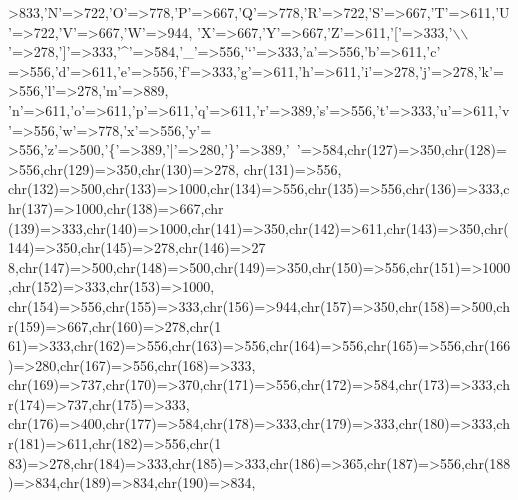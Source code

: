 \begin{DoxyCode}
{      >833,\textcolor{charliteral}{'N'}=>722,\textcolor{charliteral}{'O'}=>778,\textcolor{charliteral}{'P'}=>667,\textcolor{charliteral}{'Q'}=>778,\textcolor{charliteral}{'R'}=>722,\textcolor{charliteral}{'S'}=>667,\textcolor{charliteral}{'T'}=>611,\textcolor{charliteral}{'U'}=>722,\textcolor{charliteral}{'V'}=>667,\textcolor{charliteral}{'W'}=>944,
    \textcolor{charliteral}{'X'}=>667,\textcolor{charliteral}{'Y'}=>667,\textcolor{charliteral}{'Z'}=>611,\textcolor{charliteral}{'['}=>333,\textcolor{charliteral}{'\(\backslash\)\(\backslash\)'}=>278,\textcolor{charliteral}{']'}=>333,\textcolor{charliteral}{'^'}=>584,\textcolor{charliteral}{'\_'}=>556,\textcolor{charliteral}{'`'}=>333,\textcolor{charliteral}{'a'}=>556,\textcolor{charliteral}{'b'}=>611,\textcolor{charliteral}{'c'}
      =>556,\textcolor{charliteral}{'d'}=>611,\textcolor{charliteral}{'e'}=>556,\textcolor{charliteral}{'f'}=>333,\textcolor{charliteral}{'g'}=>611,\textcolor{charliteral}{'h'}=>611,\textcolor{charliteral}{'i'}=>278,\textcolor{charliteral}{'j'}=>278,\textcolor{charliteral}{'k'}=>556,\textcolor{charliteral}{'l'}=>278,\textcolor{charliteral}{'m'}=>889,
    \textcolor{charliteral}{'n'}=>611,\textcolor{charliteral}{'o'}=>611,\textcolor{charliteral}{'p'}=>611,\textcolor{charliteral}{'q'}=>611,\textcolor{charliteral}{'r'}=>389,\textcolor{charliteral}{'s'}=>556,\textcolor{charliteral}{'t'}=>333,\textcolor{charliteral}{'u'}=>611,\textcolor{charliteral}{'v'}=>556,\textcolor{charliteral}{'w'}=>778,\textcolor{charliteral}{'x'}=>556,\textcolor{charliteral}{'y'}=
      >556,\textcolor{charliteral}{'z'}=>500,\textcolor{charliteral}{'\{'}=>389,\textcolor{charliteral}{'|'}=>280,\textcolor{charliteral}{'\}'}=>389,\textcolor{charliteral}{'~'}=>584,chr(127)=>350,chr(128)=>556,chr(129)=>350,chr(130)=>278,
      chr(131)=>556,
    chr(132)=>500,chr(133)=>1000,chr(134)=>556,chr(135)=>556,chr(136)=>333,chr(137)=>1000,chr(138)=>667,chr
      (139)=>333,chr(140)=>1000,chr(141)=>350,chr(142)=>611,chr(143)=>350,chr(144)=>350,chr(145)=>278,chr(146)=>27
      8,chr(147)=>500,chr(148)=>500,chr(149)=>350,chr(150)=>556,chr(151)=>1000,chr(152)=>333,chr(153)=>1000,
    chr(154)=>556,chr(155)=>333,chr(156)=>944,chr(157)=>350,chr(158)=>500,chr(159)=>667,chr(160)=>278,chr(1
      61)=>333,chr(162)=>556,chr(163)=>556,chr(164)=>556,chr(165)=>556,chr(166)=>280,chr(167)=>556,chr(168)=>333,
      chr(169)=>737,chr(170)=>370,chr(171)=>556,chr(172)=>584,chr(173)=>333,chr(174)=>737,chr(175)=>333,
    chr(176)=>400,chr(177)=>584,chr(178)=>333,chr(179)=>333,chr(180)=>333,chr(181)=>611,chr(182)=>556,chr(1
      83)=>278,chr(184)=>333,chr(185)=>333,chr(186)=>365,chr(187)=>556,chr(188)=>834,chr(189)=>834,chr(190)=>834,
}
\end{DoxyCode}
